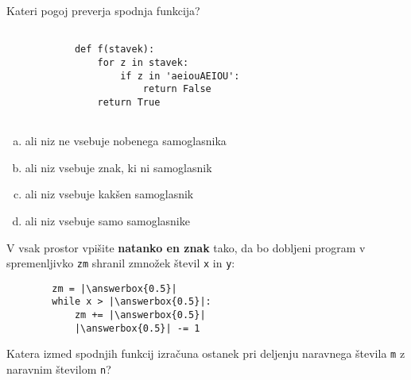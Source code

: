 \documentclass[arhiv, 10pt]{../izpit}
\newcommand{\inlinepy}[1]{\texttt{#1}}
\newcommand{\answerbox}[1]{\framebox{\vphantom{\large M}\hspace{#1cm}}}
\begin{document}
        \naloga*

        \begin{multicols}{2}
        \noindent
        Kateri pogoj preverja spodnja funkcija?
        \begin{verbatim}
        
            def f(stavek):
                for z in stavek:
                    if z in 'aeiouAEIOU':
                        return False
                return True
            
        \end{verbatim}

        \begin{enumerate}[(a)]
\item ali niz ne vsebuje nobenega samoglasnika
\item ali niz vsebuje znak, ki ni samoglasnik
\item ali niz vsebuje kakšen samoglasnik
\item ali niz vsebuje samo samoglasnike
\end{enumerate}

        \end{multicols}
    
        \naloga*
        \begin{multicols}{2}
        \noindent
        V vsak prostor vpišite \textbf{natanko en znak} tako, da bo dobljeni program v spremenljivko \inlinepy{zm} shranil zmnožek števil \inlinepy{x} in \inlinepy{y}:
        
        \columnbreak
        \begin{verbatim}
        zm = |\answerbox{0.5}|
        while x > |\answerbox{0.5}|:
            zm += |\answerbox{0.5}|
            |\answerbox{0.5}| -= 1
        \end{verbatim}
        \end{multicols}
    
        \clearpage
        \naloga
        
        Katera izmed spodnjih funkcij izračuna ostanek pri deljenju naravnega števila \inlinepy{m} z naravnim številom \inlinepy{n}?
    
\end{document}
